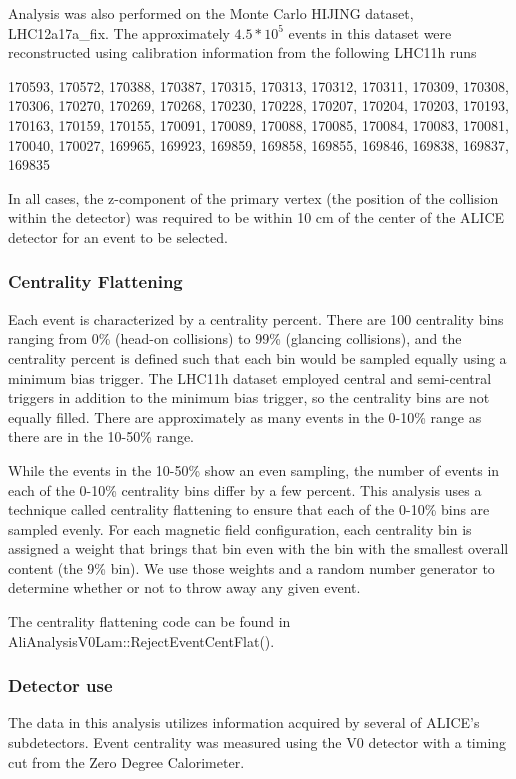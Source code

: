 Analysis was also performed on the Monte Carlo HIJING dataset, LHC12a17a\_fix.
The approximately $4.5*10^5$ events in this dataset were reconstructed using calibration information from the following LHC11h runs

170593, 170572, 170388, 170387, 170315, 170313, 170312, 170311, 170309, 170308, 170306, 170270, 170269, 170268, 170230, 170228, 170207, 170204, 170203, 170193, 170163, 170159, 170155, 170091, 170089, 170088, 170085, 170084, 170083, 170081, 170040, 170027, 169965, 169923, 169859, 169858, 169855, 169846, 169838, 169837, 169835

In all cases, the z-component of the primary vertex (the position of the collision within the detector) was required to be within 10 cm of the center of the ALICE detector for an event to be selected.  

\subsubsection{Centrality Flattening}
\label{sec:CentralityFlattening}

Each event is characterized by a centrality percent.
There are 100 centrality bins ranging from 0\%  (head-on collisions) to 99\% (glancing collisions), and the centrality percent is defined such that each bin would be sampled equally using a minimum bias trigger.
The LHC11h dataset employed central and semi-central triggers in addition to the minimum bias trigger, so the centrality bins are not equally filled.
There are approximately as many events in the 0-10\% range as there are in the 10-50\% range.

While the events in the 10-50\% show an even sampling, the number of events in each of the 0-10\% centrality bins differ by a few percent.
This analysis uses a technique called centrality flattening to ensure that each of the 0-10\% bins are sampled evenly.
For each magnetic field configuration, each centrality bin is assigned a weight that brings that bin even with the bin with the smallest overall content (the 9\% bin).
We use those weights and a random number generator to determine whether or not to throw away any given event.

The centrality flattening code can be found in AliAnalysisV0Lam::RejectEventCentFlat().


\subsubsection{Detector use}
The data in this analysis utilizes information acquired by several of ALICE's subdetectors.  
Event centrality was measured using the V0 detector with a timing cut from the Zero Degree Calorimeter. 

